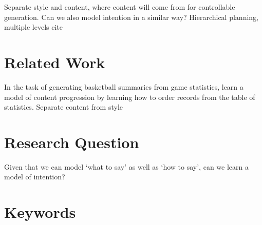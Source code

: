 \documentclass{article}
\begin{document}
Separate style and content, where content will come from for controllable generation.
Can we also model intention in a similar way?
Hierarchical planning, multiple levels
cite 
\section{Related Work}
In the task of generating basketball summaries from game statistics,
\citet{puduppully2018contentselection} learn a model of content progression
by learning how to order records from the table of statistics.
\citep{puduppully2018contentselection,wiseman2018template}
Separate content from style
\section{Research Question}
Given that we can model `what to say' as well as `how to say',
can we learn a model of intention?
\section{Keywords}
\end{document}
